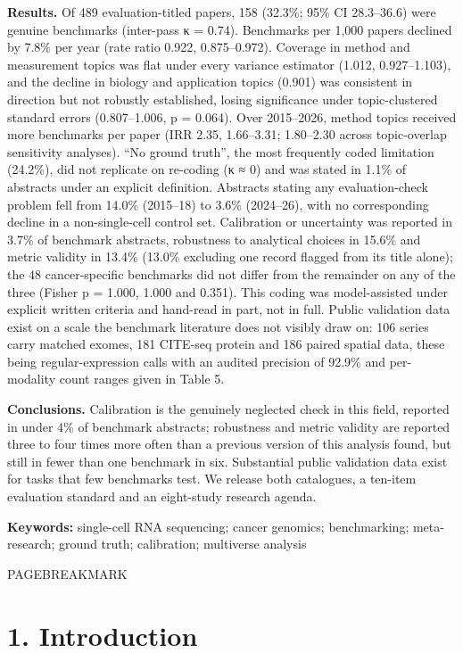\documentclass{article}
\begin{document}
\textbf{Results.} Of 489 evaluation-titled papers, 158 (32.3\%; 95\% CI
28.3--36.6) were genuine benchmarks (inter-pass κ = 0.74). Benchmarks
per 1,000 papers declined by 7.8\% per year (rate ratio 0.922,
0.875--0.972). Coverage in method and measurement topics was flat under
every variance estimator (1.012, 0.927--1.103), and the decline in
biology and application topics (0.901) was consistent in direction but
not robustly established, losing significance under topic-clustered
standard errors (0.807--1.006, p = 0.064). Over 2015--2026, method
topics received more benchmarks per paper (IRR 2.35, 1.66--3.31;
1.80--2.30 across topic-overlap sensitivity analyses). ``No ground
truth'', the most frequently coded limitation (24.2\%), did not
replicate on re-coding (κ ≈ 0) and was stated in 1.1\% of abstracts
under an explicit definition. Abstracts stating any evaluation-check
problem fell from 14.0\% (2015--18) to 3.6\% (2024--26), with no
corresponding decline in a non-single-cell control set. Calibration or
uncertainty was reported in 3.7\% of benchmark abstracts, robustness to
analytical choices in 15.6\% and metric validity in 13.4\% (13.0\%
excluding one record flagged from its title alone); the 48
cancer-specific benchmarks did not differ from the remainder on any of
the three (Fisher p = 1.000, 1.000 and 0.351). This coding was
model-assisted under explicit written criteria and hand-read in part,
not in full. Public validation data exist on a scale the benchmark
literature does not visibly draw on: 106 series carry matched exomes,
181 CITE-seq protein and 186 paired spatial data, these being
regular-expression calls with an audited precision of 92.9\% and
per-modality count ranges given in Table 5.

\textbf{Conclusions.} Calibration is the genuinely neglected check in
this field, reported in under 4\% of benchmark abstracts; robustness and
metric validity are reported three to four times more often than a
previous version of this analysis found, but still in fewer than one
benchmark in six. Substantial public validation data exist for tasks
that few benchmarks test. We release both catalogues, a ten-item
evaluation standard and an eight-study research agenda.

\textbf{Keywords:} single-cell RNA sequencing; cancer genomics;
benchmarking; meta-research; ground truth; calibration; multiverse
analysis



PAGEBREAKMARK

\section{1. Introduction}\label{introduction}
\end{document}
